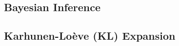 \vspace{-1em}
\subsection{Bayesian Inference} 


\vspace{-0.5em}
\subsection{Karhunen-Lo\`{e}ve (KL) Expansion} 

